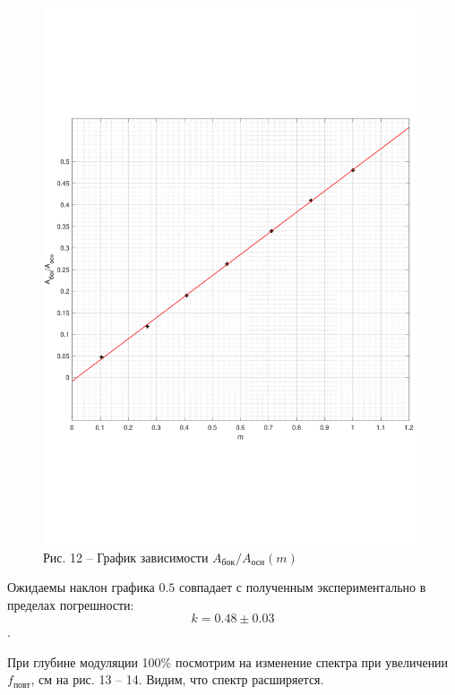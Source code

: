 \documentclass[a4paper,14pt]{article}
\begin{document}
\begin{center}
	\begin{figure}[hbt!]
		\centering
		\includegraphics[width=0.72\linewidth]{gr3.pdf} \\
		Рис. 12 -- График зависимости $A_{\text{бок}}/A_{\text{осн}}(m)$
		\label{gr3}
	\end{figure}
\end{center}


Ожидаемы наклон графика $0.5$ совпадает с полученным экспериментально в пределах погрешности: $$k = 0.48 \pm 0.03$$.

При глубине модуляции 100$\%$ посмотрим на изменение спектра при увеличении $f_\text{повт}$, см на рис. 13 -- 14. Видим, что спектр расширяется.
\end{document}
